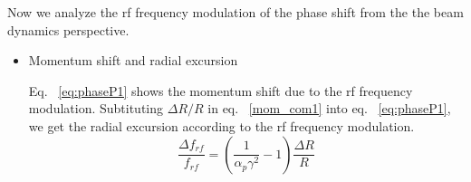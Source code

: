 Now we analyze the rf frequency modulation of the phase shift from the the beam dynamics perspective.
\begin{itemize}

	\item Momentum shift and radial excursion

Eq. ~\ref{eq:phaseP1} shows the momentum shift due to the rf frequency modulation. Subtituting ${\Delta R}/{R}$ in eq. ~\ref{mom_com1} into eq. ~\ref{eq:phaseP1}, we get the radial excursion according to the rf frequency modulation.
\begin{equation}
\label{eq:phaseR}
\frac{\Delta f_{\mathit{rf}}}{f_{\mathit{rf}}} =({\frac{1}{\alpha_{\mathit{p}}\gamma^2}-1}) \frac{\Delta{R}}{R}
\end{equation}


\end{itemize}
